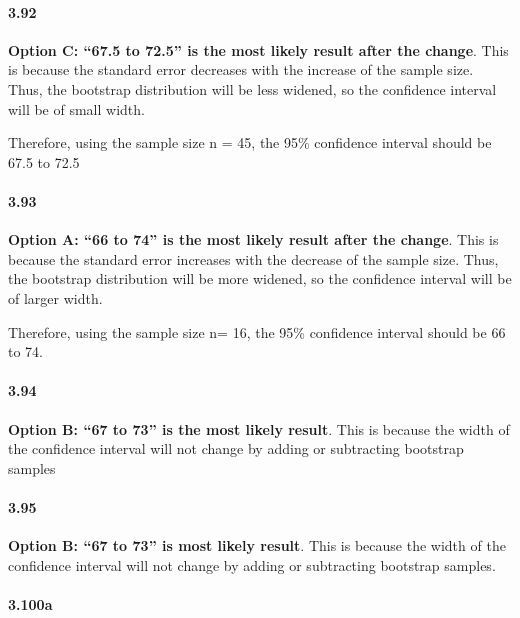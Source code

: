 \documentclass[
]{article}
\begin{document}
\hypertarget{section-6}{%
\paragraph{3.92}\label{section-6}}

\textbf{Option C: ``67.5 to 72.5'' is the most likely result after the
change}. This is because the standard error decreases with the increase
of the sample size. Thus, the bootstrap distribution will be less
widened, so the confidence interval will be of small width.

Therefore, using the sample size n = 45, the 95\% confidence interval
should be 67.5 to 72.5

\hypertarget{section-7}{%
\paragraph{3.93}\label{section-7}}

\textbf{Option A: ``66 to 74'' is the most likely result after the
change}. This is because the standard error increases with the decrease
of the sample size. Thus, the bootstrap distribution will be more
widened, so the confidence interval will be of larger width.

Therefore, using the sample size n= 16, the 95\% confidence interval
should be 66 to 74.

\hypertarget{section-8}{%
\paragraph{3.94}\label{section-8}}

\textbf{Option B: ``67 to 73'' is the most likely result}. This is
because the width of the confidence interval will not change by adding
or subtracting bootstrap samples

\hypertarget{section-9}{%
\paragraph{3.95}\label{section-9}}

\textbf{Option B: ``67 to 73'' is most likely result}. This is because
the width of the confidence interval will not change by adding or
subtracting bootstrap samples.

\hypertarget{a-14}{%
\paragraph{3.100a}\label{a-14}}
\end{document}
